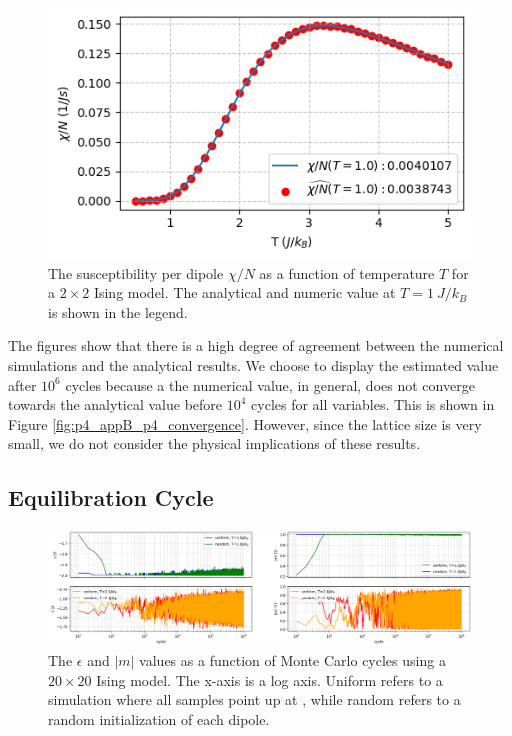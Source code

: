 \documentclass[../main_proj4_correct_template.tex]{subfiles}
\begin{document}
\begin{figure}[h!]
    \centering
    \includegraphics[width=0.8\linewidth]{Project 4/figures/p4_chi.png}
    \caption{The susceptibility per dipole $\chi/N$ as a function of temperature $T$ for a $2\times 2$ Ising model. The analytical and numeric value at $T=1~J/k_B$ is shown in the legend.}
    \label{fig:p4_chi}
\end{figure}

The figures show that there is a high degree of agreement between the numerical simulations and the analytical results. We choose to display the estimated value after $10^{6}$ cycles because a the numerical value, in general, does not converge towards the analytical value before $10^{4}$ cycles for all variables. This is shown in Figure \ref{fig:p4_appB_p4_convergence}. However, since the lattice size is very small, we do not consider the physical implications of these results. 


\subsection{Equilibration Cycle}

\begin{figure}[htb!]
    \centering
    \includegraphics[width=0.95\linewidth]{Project 4/figures/p5_equilibration_rawvalues.png}
    \caption{The $\epsilon$ and $|m|$ values as a function of Monte Carlo cycles using a $20\times 20$ Ising model. The x-axis is a log axis. Uniform refers to a simulation where all samples point up at , while random refers to a random initialization of each dipole. }
    \label{fig:p4_p5_equilibration}
\end{figure}
\end{document}
